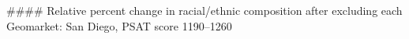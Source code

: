 #### Relative percent change in racial/ethnic composition after excluding each Geomarket: San Diego, PSAT score 1190–1260
